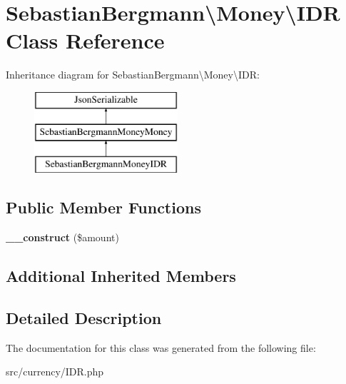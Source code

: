 \hypertarget{classSebastianBergmann_1_1Money_1_1IDR}{}\section{Sebastian\+Bergmann\textbackslash{}Money\textbackslash{}I\+D\+R Class Reference}
\label{classSebastianBergmann_1_1Money_1_1IDR}
Inheritance diagram for Sebastian\+Bergmann\textbackslash{}Money\textbackslash{}I\+D\+R\+:\begin{figure}[H]
\begin{center}
\leavevmode
\includegraphics[height=3.000000cm]{classSebastianBergmann_1_1Money_1_1IDR}
\end{center}
\end{figure}
\subsection*{Public Member Functions}
\begin{DoxyCompactItemize}
\item 
\hypertarget{classSebastianBergmann_1_1Money_1_1IDR_ae4b9596f4f94995641c31eff2c1544ef}{}{\bfseries \+\_\+\+\_\+construct} (\$amount)\label{classSebastianBergmann_1_1Money_1_1IDR_ae4b9596f4f94995641c31eff2c1544ef}

\end{DoxyCompactItemize}
\subsection*{Additional Inherited Members}


\subsection{Detailed Description}


The documentation for this class was generated from the following file\+:\begin{DoxyCompactItemize}
\item 
src/currency/I\+D\+R.\+php\end{DoxyCompactItemize}
